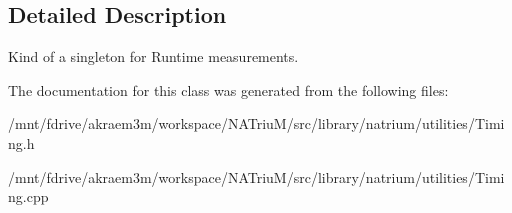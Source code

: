 \subsection{Detailed Description}
Kind of a singleton for Runtime measurements. 

The documentation for this class was generated from the following files:\begin{DoxyCompactItemize}
\item 
/mnt/fdrive/akraem3m/workspace/NATriuM/src/library/natrium/utilities/Timing.h\item 
/mnt/fdrive/akraem3m/workspace/NATriuM/src/library/natrium/utilities/Timing.cpp\end{DoxyCompactItemize}
